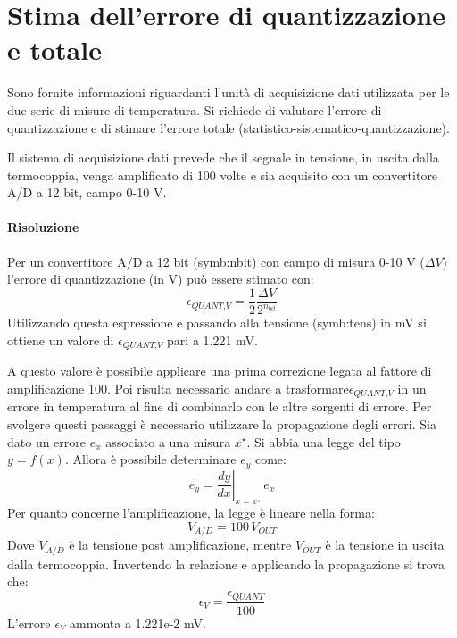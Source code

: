 \clearpage
\section{Stima dell'errore di quantizzazione e totale}
Sono fornite informazioni riguardanti l'unità di acquisizione dati utilizzata per le due serie di misure di temperatura. Si richiede di valutare l'errore di quantizzazione e di stimare l'errore totale (statistico-sistematico-quantizzazione).

Il sistema di acquisizione dati prevede che il segnale in tensione, in uscita dalla termocoppia, venga amplificato di 100 volte e sia acquisito con un convertitore A/D a 12 bit, campo 0-10 V.

\paragraph{Risoluzione}
Per un convertitore A/D a 12 bit (\gls{symb:nbit}) con campo di misura 0-10 V ($\Delta V$) l'errore di quantizzazione (in V) può essere stimato con: 
\begin{equation}
	\epsilon_{\textit{QUANT,V}} = \frac{1}{2} \frac{\Delta V}{2^{n_{bit}}}
\end{equation}
Utilizzando questa espressione e passando alla tensione (\gls{symb:tens}) in mV si ottiene un valore di $\epsilon_{\textit{QUANT,V}} $ pari a 1.221 mV. 

A questo valore è possibile applicare una prima correzione legata al fattore di amplificazione 100. Poi risulta necessario andare a trasformare$\epsilon_{\textit{QUANT,V}}$ in un errore in temperatura al fine di combinarlo con le altre sorgenti di errore. 
Per svolgere questi passaggi è necessario utilizzare la propagazione degli errori. Sia dato un errore $e_x$ associato a una misura $x^\star$. Si abbia una legge del tipo $y=f(x)$. Allora è possibile determinare $e_y$ come:
\begin{equation}
	e_y = \left. \frac{dy}{dx} \right\vert _{x=x^\star} \, e_x
\end{equation}
Per quanto concerne l'amplificazione, la legge è lineare nella forma:
\begin{equation}
	V_{A/D} = 100\, V_{OUT}
\end{equation}
Dove $V_{A/D}$ è la tensione post amplificazione, mentre $V_{OUT}$ è la tensione in uscita dalla termocoppia. Invertendo la relazione e applicando la propagazione si trova che:
\begin{equation}
	\epsilon_{\textit{V}} = \frac{\epsilon_{\textit{QUANT}}}{100}
\end{equation}
L'errore $\epsilon_{\textit{V}}$ ammonta a 1.221e-2 mV.

